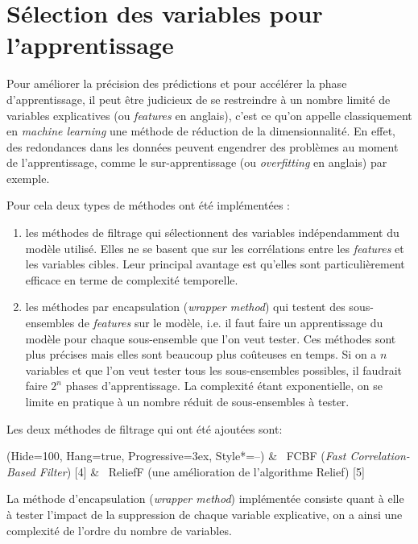 \section{Sélection des variables pour l’apprentissage}

Pour améliorer la précision des prédictions et pour accélérer la phase d’apprentissage, il peut être judicieux de se restreindre à un nombre limité de variables explicatives (ou \textit{features} en anglais), c’est ce qu’on appelle classiquement en \textit{machine learning} une méthode de réduction de la dimensionnalité. En effet, des redondances dans les données peuvent engendrer des problèmes au moment de l’apprentissage, comme le sur-apprentissage (ou \textit{overfitting} en anglais) par exemple.

Pour cela deux types de méthodes ont été implémentées : 
\begin{enumerate}
\item les méthodes de filtrage qui sélectionnent des variables indépendamment du modèle utilisé. Elles ne se basent que sur les corrélations entre les \textit{features} et les variables cibles. Leur principal avantage est qu’elles sont particulièrement efficace en terme de complexité temporelle.
\item les méthodes par encapsulation (\textit{wrapper method}) qui testent des sous-ensembles de \textit{features} sur le modèle, i.e. il faut faire un apprentissage du modèle pour chaque sous-ensemble que l’on veut tester. Ces méthodes sont plus précises mais elles sont beaucoup plus coûteuses en temps. Si on a $n$ variables et que l’on veut tester tous les sous-ensembles possibles, il faudrait faire $2^{n}$ phases d’apprentissage. La complexité étant exponentielle, on se limite en pratique à un nombre réduit de sous-ensembles à tester.
\end{enumerate}

Les deux méthodes de filtrage qui ont été ajoutées sont:
\begin{easylist}
\ListProperties(Hide=100, Hang=true, Progressive=3ex, Style*=--)
& ~FCBF (\textit{Fast Correlation-Based Filter}) [4]
& ~ReliefF (une amélioration de l’algorithme Relief) [5] 
\end{easylist}

La méthode d’encapsulation (\textit{wrapper method}) implémentée consiste quant à elle à tester l’impact de la suppression de chaque variable explicative, on a ainsi une complexité de l’ordre du nombre de variables.

